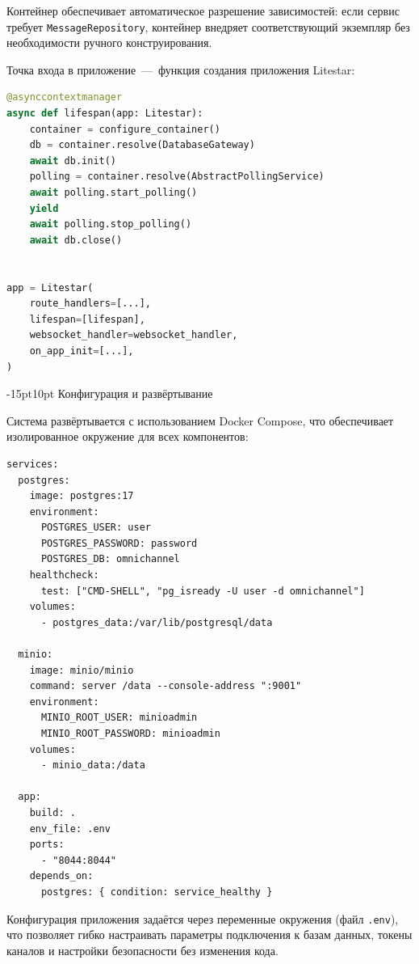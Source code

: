 \documentclass[12pt,a4paper]{report}
\makeatletter
\renewcommand{\section}{%
  \@startsection{section}{1}{\z@}%
  {-15pt}{10pt}%
  {\centering\normalfont\bfseries\large}}
\makeatother
\begin{document}
Контейнер обеспечивает автоматическое разрешение зависимостей: если сервис требует \texttt{MessageRepository}, контейнер внедряет соответствующий экземпляр без необходимости ручного конструирования.

Точка входа в приложение~---~функция создания приложения Litestar:

\begin{lstlisting}[language=Python]
@asynccontextmanager
async def lifespan(app: Litestar):
    container = configure_container()
    db = container.resolve(DatabaseGateway)
    await db.init()
    polling = container.resolve(AbstractPollingService)
    await polling.start_polling()
    yield
    await polling.stop_polling()
    await db.close()


app = Litestar(
    route_handlers=[...],
    lifespan=[lifespan],
    websocket_handler=websocket_handler,
    on_app_init=[...],
)
\end{lstlisting}

\section{Конфигурация и развёртывание}

Система развёртывается с использованием Docker Compose, что обеспечивает изолированное окружение для всех компонентов:

\begin{lstlisting}[language={},frame=single,backgroundcolor=\color{gray!7},numbers=none]
services:
  postgres:
    image: postgres:17
    environment:
      POSTGRES_USER: user
      POSTGRES_PASSWORD: password
      POSTGRES_DB: omnichannel
    healthcheck:
      test: ["CMD-SHELL", "pg_isready -U user -d omnichannel"]
    volumes:
      - postgres_data:/var/lib/postgresql/data

  minio:
    image: minio/minio
    command: server /data --console-address ":9001"
    environment:
      MINIO_ROOT_USER: minioadmin
      MINIO_ROOT_PASSWORD: minioadmin
    volumes:
      - minio_data:/data

  app:
    build: .
    env_file: .env
    ports:
      - "8044:8044"
    depends_on:
      postgres: { condition: service_healthy }
\end{lstlisting}

Конфигурация приложения задаётся через переменные окружения (файл \texttt{.env}), что позволяет гибко настраивать параметры подключения к базам данных, токены каналов и настройки безопасности без изменения кода.
\end{document}
